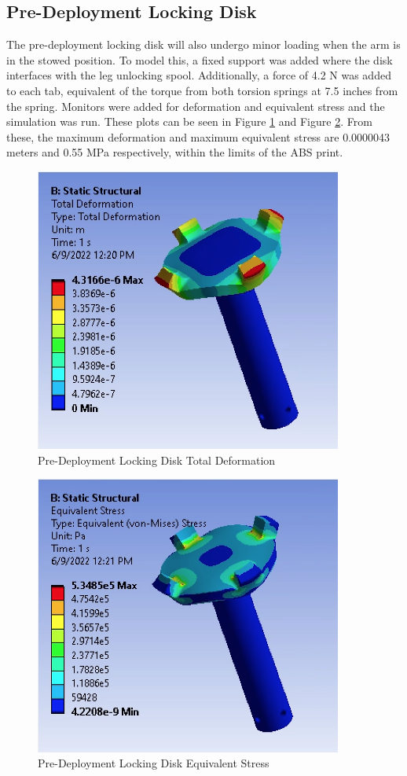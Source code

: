 \subsection{Pre-Deployment Locking Disk}
The pre-deployment locking disk will also undergo minor loading when the arm is in the stowed position. To model this, a fixed support was added where the disk interfaces with the leg unlocking spool. Additionally, a force of 4.2 N was added to each tab, equivalent of the torque from both torsion springs at 7.5 inches from the spring. Monitors were added for deformation and equivalent stress and the simulation was run. These plots can be seen in Figure \ref{fig:diskdef} and Figure \ref{fig:diskstress}. From these, the maximum deformation and maximum equivalent stress are 0.0000043 meters and 0.55 MPa respectively, within the limits of the ABS print.
\begin{figure}[H]
    \centering
    \includegraphics[width=0.9\textwidth]{src/figs/disk-deformation.png}
    \caption{Pre-Deployment Locking Disk Total Deformation}
    \label{fig:diskdef}
\end{figure}
\begin{figure}[H]
    \centering
    \includegraphics[width=0.9\textwidth]{src/figs/disk-stress.png}
    \caption{Pre-Deployment Locking Disk Equivalent Stress}
    \label{fig:diskstress}
\end{figure}


